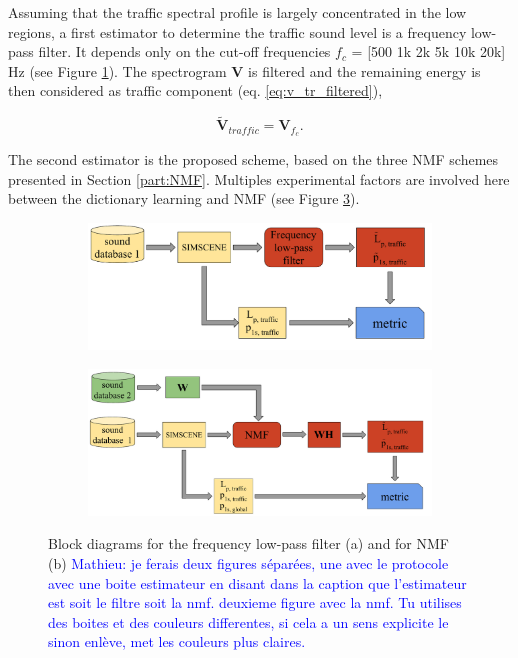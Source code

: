 \documentclass[twocolumn,a4paper,10pt]{article}
\newcommand{\ml}[1]{\textcolor{blue}{ Mathieu: #1}}
\begin{document}
Assuming that the traffic spectral profile is largely concentrated in the low regions, a first estimator to determine the traffic sound level is a frequency low-pass filter. It depends only on the cut-off frequencies $f_c$ = [500 1k 2k 5k 10k 20k] Hz (see Figure \ref{fig:bloc_filtre}). The spectrogram $\mathbf{V}$ is filtered and the remaining energy is then considered as traffic component (eq. \ref{eq:v_tr_filtered}),

\begin{equation}\label{eq:v_tr_filtered}
\mathbf{\tilde{V}}_{traffic} = \mathbf{V}_{f_c}.
\end{equation}

The second estimator is the proposed scheme, based on the three NMF schemes presented in Section \ref{part:NMF}. Multiples experimental factors are involved here between the dictionary learning and NMF (see Figure \ref{fig:bloc_nmf}).

\begin{figure}

    \centering
    \begin{subfigure}[t]{0.45\textwidth}
        \centering
        \includegraphics[width=\linewidth]{figures/bloc_diagram_filtrage_EN.pdf}
  		\caption{}
  		\label{fig:bloc_filtre}
    \end{subfigure}%
    \vfill
    \begin{subfigure}[t]{0.45\textwidth}
        \centering
        \includegraphics[width=\linewidth]{figures/bloc_diagram_NMF_EN.pdf}
		\caption{}
		\label{fig:bloc_nmf}
    \end{subfigure}

    \caption{Block diagrams for the frequency low-pass filter (a) and for NMF (b) \ml{je ferais deux figures séparées, une avec le protocole avec une boite estimateur en disant dans la caption que l'estimateur est soit le filtre soit la nmf. deuxieme figure avec la nmf. Tu utilises des boites et des couleurs differentes, si cela a un sens explicite le sinon enlève, met les couleurs plus claires.}}
\end{figure}
\end{document}
